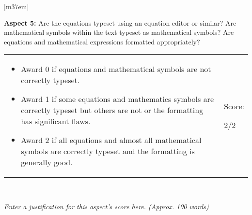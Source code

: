 \documentclass[article,11pt]{book}
\begin{document}
\bigskip


\begin{tabular}{|m{37em}|}
    \hline
    
    \textbf{Aspect 5:} Are the equations typeset using an equation editor or similar? Are mathematical symbols within the text typeset as mathematical symbols? Are equations and mathematical expressions formatted appropriately?  
    \\ \hline
    
    \begin{tabular}{m{32em}|m{5em}}
      \begin{itemize}
          \item Award 0 if equations and mathematical symbols are not correctly typeset.
          \item Award 1 if some equations and mathematics symbols are correctly typeset but others are not or the formatting has significant flaws.
          \item Award 2 if all equations and almost all mathematical symbols are correctly typeset and the formatting is generally good.
      \end{itemize}  
      &  
      Score: 
      
      \medskip
      {\huge 2/2}
    \end{tabular} 
    \\ \hline
    
    \textit{Enter a justification for this aspect’s score here. (Approx. 100 words)}
    \\ \hline
\end{tabular}
\end{document}
